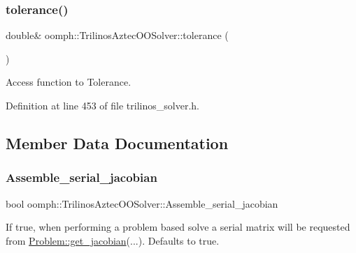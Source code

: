 \mbox{\label{classoomph_1_1TrilinosAztecOOSolver_afc08e5d6996fe05b93d68ff3cec6a478}} 
\subsubsection{\texorpdfstring{tolerance()}{tolerance()}}
{\footnotesize\ttfamily double\& oomph\+::\+Trilinos\+Aztec\+O\+O\+Solver\+::tolerance (\begin{DoxyParamCaption}{ }\end{DoxyParamCaption})\hspace{0.3cm}{\ttfamily [inline]}}



Access function to Tolerance. 



Definition at line 453 of file trilinos\+\_\+solver.\+h.



\subsection{Member Data Documentation}
\mbox{\label{classoomph_1_1TrilinosAztecOOSolver_a3bfc11cd816eee847f102327ae4315aa}} 
\subsubsection{\texorpdfstring{Assemble\+\_\+serial\+\_\+jacobian}{Assemble\_serial\_jacobian}}
{\footnotesize\ttfamily bool oomph\+::\+Trilinos\+Aztec\+O\+O\+Solver\+::\+Assemble\+\_\+serial\+\_\+jacobian\hspace{0.3cm}{\ttfamily [protected]}}



If true, when performing a problem based solve a serial matrix will be requested from \hyperlink{classoomph_1_1Problem_a4ba83bbea19db3a530539f3e9f88a7e4}{Problem\+::get\+\_\+jacobian}(...). Defaults to true. 



